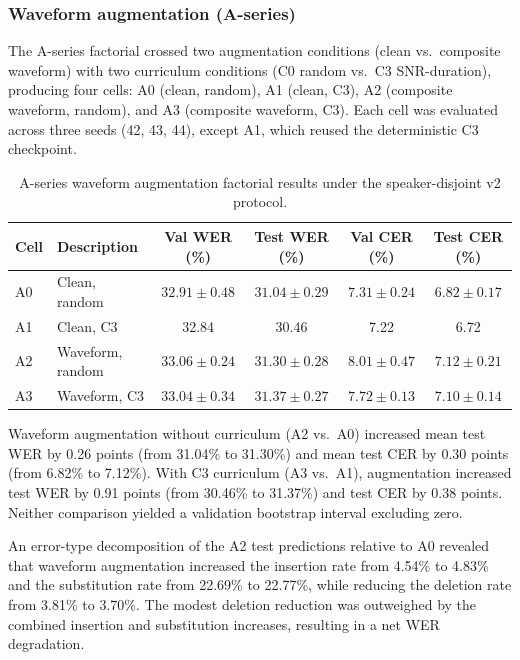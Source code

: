 \subsubsection{Waveform augmentation (A-series)}

The A-series factorial crossed two augmentation conditions (clean vs.\ composite
waveform) with two curriculum conditions (C0 random vs.\ C3 SNR-duration),
producing four cells: A0 (clean, random), A1 (clean, C3), A2 (composite
waveform, random), and A3 (composite waveform, C3). Each cell was evaluated
across three seeds (42, 43, 44), except A1, which reused the deterministic C3
checkpoint.

\begin{table}[H]
\centering
\caption{A-series waveform augmentation factorial results under the
speaker-disjoint v2 protocol.}
\label{tab:a-series}
\begin{tabular}{llcccc}
\hline
\textbf{Cell} & \textbf{Description} & \textbf{Val WER (\%)} & \textbf{Test WER (\%)} & \textbf{Val CER (\%)} & \textbf{Test CER (\%)} \\
\hline
A0 & Clean, random      & $32.91 \pm 0.48$ & $31.04 \pm 0.29$ & $7.31 \pm 0.24$ & $6.82 \pm 0.17$ \\
A1 & Clean, C3          & 32.84            & 30.46            & 7.22            & 6.72 \\
A2 & Waveform, random   & $33.06 \pm 0.24$ & $31.30 \pm 0.28$ & $8.01 \pm 0.47$ & $7.12 \pm 0.21$ \\
A3 & Waveform, C3       & $33.04 \pm 0.34$ & $31.37 \pm 0.27$ & $7.72 \pm 0.13$ & $7.10 \pm 0.14$ \\
\hline
\end{tabular}
\end{table}

Waveform augmentation without curriculum (A2 vs.\ A0) increased mean test WER
by 0.26 points (from 31.04\% to 31.30\%) and mean test CER by 0.30 points (from
6.82\% to 7.12\%). With C3 curriculum (A3 vs.\ A1), augmentation increased test
WER by 0.91 points (from 30.46\% to 31.37\%) and test CER by 0.38 points.
Neither comparison yielded a validation bootstrap interval excluding zero.

An error-type decomposition of the A2 test predictions relative to A0 revealed
that waveform augmentation increased the insertion rate from 4.54\% to 4.83\%
and the substitution rate from 22.69\% to 22.77\%, while reducing the deletion
rate from 3.81\% to 3.70\%. The modest deletion reduction was outweighed by the
combined insertion and substitution increases, resulting in a net WER
degradation.

